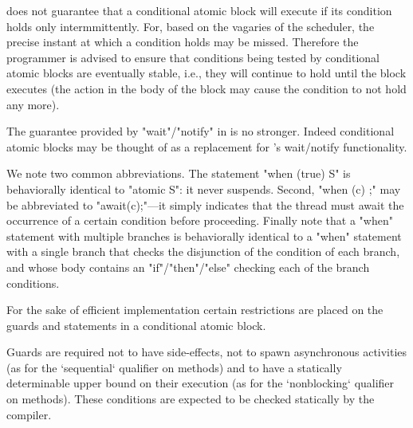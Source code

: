 {\Xten{} does not guarantee that a conditional atomic block
will execute if its condition holds only intermmittently. For, based on
the vagaries of the scheduler, the precise instant at which a
condition holds may be missed. Therefore the programmer is advised to
ensure that conditions being tested by conditional atomic blocks are
eventually stable, i.e., they will continue to hold until the block
executes (the action in the body of the block may cause the condition
to not hold any more).


\begin{rationale}
The guarantee provided by \xcd"wait"/\xcd"notify" in \java{} is no
stronger. Indeed conditional atomic blocks may be thought of as a
replacement for \java's wait/notify functionality.
\end{rationale} 

We note two common abbreviations. The statement \xcd"when (true) S" is
behaviorally identical to \xcd"atomic S": it never suspends. Second,
\xcd"when (c) {;}" may be abbreviated to \xcd"await(c);"---it
simply indicates that the thread must await the occurrence of a
certain condition before proceeding.  Finally note that a \xcd"when"
statement with multiple branches is behaviorally identical to a
\xcd"when" statement with a single branch that checks the disjunction of
the condition of each branch, and whose body contains an
\xcd"if"/\xcd"then"/\xcd"else" checking each of the branch conditions.

\begin{staticrule*}
For the sake of efficient implementation certain restrictions are
placed on the guards and statements in a conditional atomic
block. 
\end{staticrule*}

Guards are required not to have side-effects, not to spawn asynchronous
activities (as for the \xcd`sequential` qualifier on methods) and to have a
statically determinable upper bound on their execution (as for the
\xcd`nonblocking` qualifier on methods). These conditions are expected to be
checked statically by the compiler.

}
